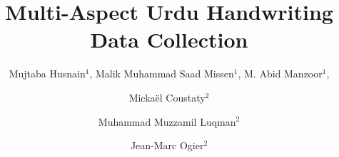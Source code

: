 





%
\title{Multi-Aspect Urdu Handwriting Data Collection}

%		
\author{Mujtaba Husnain$^1$,
		Malik Muhammad Saad Missen$^1$,
		M. Abid Manzoor$^1$,\\ \and 
		Mickaël Coustaty$^2$ \and 
		Muhammad Muzzamil Luqman$^2$ \and 
		Jean-Marc Ogier$^2$
}

